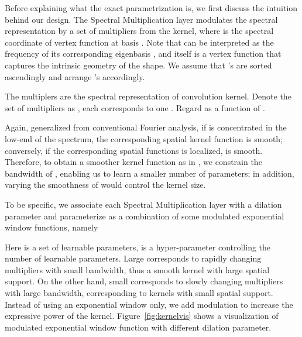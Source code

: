 \documentclass[10pt,twocolumn,letterpaper]{article}
\begin{document}
Before explaining what the exact parametrization is, we first discuss the intuition behind our design. The Spectral Multiplication layer modulates the spectral representation  by a set of multipliers from the kernel, where  is the spectral coordinate of vertex function at basis . Note that  can be interpreted as the frequency of its corresponding eigenbasis , and  itself is a vertex function that captures the intrinsic geometry of the shape. We assume that 's are sorted ascendingly and arrange 's accordingly.

The multiplers are the spectral representation of convolution kernel. Denote the set of multipliers as , each corresponds to one . Regard  as a function of . 

Again, generalized from conventional Fourier analysis, if  is concentrated in the low-end of the spectrum, the corresponding spatial kernel function is smooth; conversely, if the corresponding spatial functions is localized,  is smooth. Therefore, to obtain a smoother kernel function as in \cite{yu2015multi}, we constrain the bandwidth of , enabling us to learn a smaller number of parameters; in addition, varying the smoothness of  would control the kernel size. 

To be specific, we associate each Spectral Multiplication layer with a dilation parameter  and parameterize  as a combination of some modulated exponential window functions, namely

\vspace{-0.25cm}


Here  is a set of  learnable parameters,  is a hyper-parameter controlling the number of learnable parameters. Large  corresponds to rapidly changing multipliers with small bandwidth, thus a smooth kernel with large spatial support. On the other hand, small  corresponds to slowly changing multipliers with large bandwidth, corresponding to kernels with small spatial support. Instead of using an exponential window only, we add  modulation to increase the expressive power of the kernel. Figure~\ref{fig:kernelvis} shows a visualization of modulated exponential window function with different dilation parameter.
\end{document}

